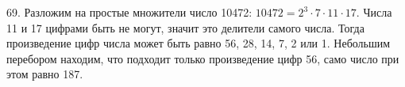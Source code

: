 69. Разложим на простые множители число 10472: $10472=2^3\cdot7\cdot11\cdot17.$ Числа 11 и 17 цифрами быть не могут, значит это делители самого числа. Тогда произведение цифр числа может быть равно 56, 28, 14, 7, 2 или 1. Небольшим перебором находим, что подходит только произведение цифр 56, само число при этом равно 187.\\
